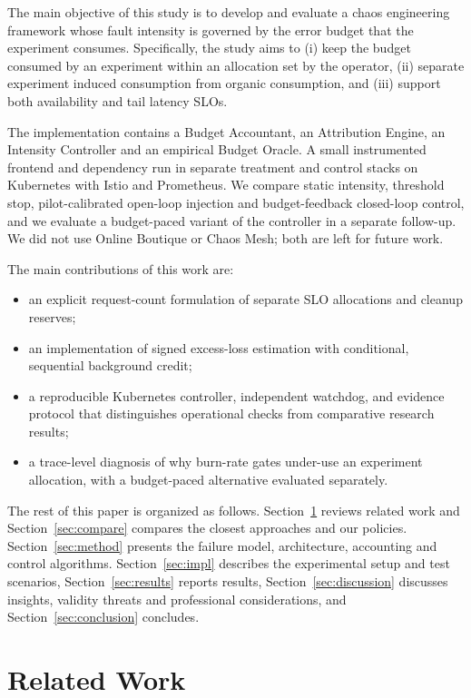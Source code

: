 \documentclass[a4paper,fleqn,11pt]{cas-dc}
\begin{document}
The main objective of this study is to develop and evaluate a chaos engineering framework whose fault intensity is governed by the error budget that the experiment consumes. Specifically, the study aims to (i) keep the budget consumed by an experiment within an allocation set by the operator, (ii) separate experiment induced consumption from organic consumption, and (iii) support both availability and tail latency SLOs.

The implementation contains a Budget Accountant, an Attribution Engine, an Intensity Controller and an empirical Budget Oracle. A small instrumented frontend and dependency run in separate treatment and control stacks on Kubernetes with Istio and Prometheus. We compare static intensity, threshold stop, pilot-calibrated open-loop injection and budget-feedback closed-loop control, and we evaluate a budget-paced variant of the controller in a separate follow-up. We did not use Online Boutique or Chaos Mesh; both are left for future work.

The main contributions of this work are:
\begin{itemize}
\item an explicit request-count formulation of separate SLO allocations and cleanup reserves;
\item an implementation of signed excess-loss estimation with conditional, sequential background credit;
\item a reproducible Kubernetes controller, independent watchdog, and evidence protocol that distinguishes operational checks from comparative research results;
\item a trace-level diagnosis of why burn-rate gates under-use an experiment allocation, with a budget-paced alternative evaluated separately.
\end{itemize}

The rest of this paper is organized as follows. Section~\ref{sec:lit} reviews related work and Section~\ref{sec:compare} compares the closest approaches and our policies. Section~\ref{sec:method} presents the failure model, architecture, accounting and control algorithms. Section~\ref{sec:impl} describes the experimental setup and test scenarios, Section~\ref{sec:results} reports results, Section~\ref{sec:discussion} discusses insights, validity threats and professional considerations, and Section~\ref{sec:conclusion} concludes.

\section{Related Work}\label{sec:lit}
\end{document}
